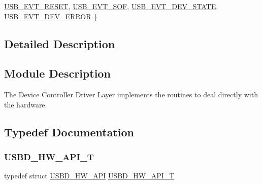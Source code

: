 \begin{DoxyCompactItemize}
\hyperlink{group___u_s_b_d___h_w_gga61dde6aa35d2912927ef1b185eedaa13ac9da611df8ba920792bb1388c70fbc53}{U\+S\+B\+\_\+\+E\+V\+T\+\_\+\+R\+E\+S\+ET}, 
\hyperlink{group___u_s_b_d___h_w_gga61dde6aa35d2912927ef1b185eedaa13a327107e15682a2403deec540ca209670}{U\+S\+B\+\_\+\+E\+V\+T\+\_\+\+S\+OF}, 
\hyperlink{group___u_s_b_d___h_w_gga61dde6aa35d2912927ef1b185eedaa13ae30ace519ceb787d84de55ebf5e4901e}{U\+S\+B\+\_\+\+E\+V\+T\+\_\+\+D\+E\+V\+\_\+\+S\+T\+A\+TE}, 
\newline
\hyperlink{group___u_s_b_d___h_w_gga61dde6aa35d2912927ef1b185eedaa13a7e46c0177f969c8be4e4a40784c7c2f4}{U\+S\+B\+\_\+\+E\+V\+T\+\_\+\+D\+E\+V\+\_\+\+E\+R\+R\+OR}
 \}
\end{DoxyCompactItemize}


\subsection{Detailed Description}
\hypertarget{group___u_s_b_d___h_w_Sec_HWModDescription}{}\subsection{Module Description}\label{group___u_s_b_d___h_w_Sec_HWModDescription}
The Device Controller Driver Layer implements the routines to deal directly with the hardware. 

\subsection{Typedef Documentation}
\mbox{\label{group___u_s_b_d___h_w_ga4df5b7beaddc4e9267c320d92b4434fc}} 
\subsubsection{\texorpdfstring{U\+S\+B\+D\+\_\+\+H\+W\+\_\+\+A\+P\+I\+\_\+T}{USBD\_HW\_API\_T}}
{\footnotesize\ttfamily typedef struct \hyperlink{struct_u_s_b_d___h_w___a_p_i}{U\+S\+B\+D\+\_\+\+H\+W\+\_\+\+A\+PI}  \hyperlink{group___u_s_b_d___h_w_ga4df5b7beaddc4e9267c320d92b4434fc}{U\+S\+B\+D\+\_\+\+H\+W\+\_\+\+A\+P\+I\+\_\+T}}



